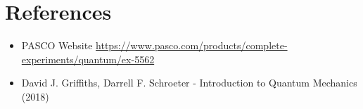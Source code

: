 \documentclass[11pt]{article}
\begin{document}
\clearpage
	
	\section{References}
	\begin{itemize}
		\item PASCO Website \href{https://www.pasco.com/products/complete-experiments/quantum/ex-5562}{https://www.pasco.com/products/complete-experiments/quantum/ex-5562}
		\item David J. Griffiths, Darrell F. Schroeter - Introduction to Quantum Mechanics (2018)
	\end{itemize}	
	
\end{document}
